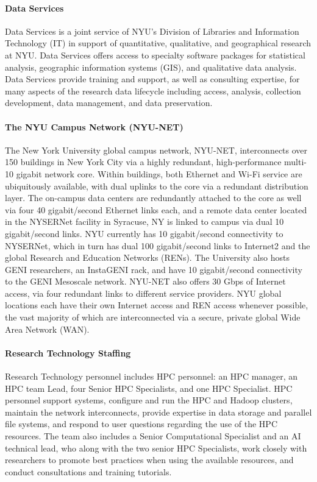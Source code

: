 \paragraph{Data Services}
Data Services is a joint service of NYU's Division of Libraries and Information Technology (IT) in support of quantitative, qualitative, and geographical research at NYU. Data Services offers access to specialty software packages for statistical analysis, geographic information systems (GIS), and qualitative data analysis. Data Services provide training and support, as well as consulting expertise, for many aspects of the research data lifecycle including access, analysis, collection development, data management, and data preservation.

\paragraph{The NYU Campus Network (NYU-NET)}
The New York University global campus network, NYU-NET, interconnects over 150 buildings in New York City via a highly redundant, high-performance multi-10 gigabit network core.  Within buildings, both Ethernet and Wi-Fi service are ubiquitously available, with dual uplinks to the core via a redundant distribution layer.  The on-campus data centers are redundantly attached to the core as well via four 40 gigabit/second Ethernet links each, and a remote data center located in the NYSERNet facility in Syracuse, NY is linked to campus via dual 10 gigabit/second links.  NYU currently has 10 gigabit/second connectivity to NYSERNet, which in turn has dual 100 gigabit/second links to Internet2 and the global Research and Education Networks (RENs).  The University also hosts GENI researchers, an InstaGENI rack, and have 10 gigabit/second connectivity to the GENI Mesoscale network. NYU-NET also offers 30 Gbps of Internet access, via four redundant links to different service providers. NYU global locations each have their own Internet access and REN access whenever possible, the vast majority of which are interconnected via a secure, private global Wide Area Network (WAN).

\paragraph{Research Technology Staffing}
Research Technology personnel includes HPC personnel: an HPC manager, an HPC team Lead, four Senior HPC Specialists, and one HPC Specialist. HPC personnel support systems, configure and run the HPC and Hadoop clusters, maintain the network interconnects, provide expertise in data storage and parallel file systems, and respond to user questions regarding the use of the HPC resources. The team also includes a Senior Computational Specialist and an AI technical lead, who along with the two senior HPC Specialists, work closely with researchers to promote best practices when using the available resources, and conduct consultations and training tutorials.

